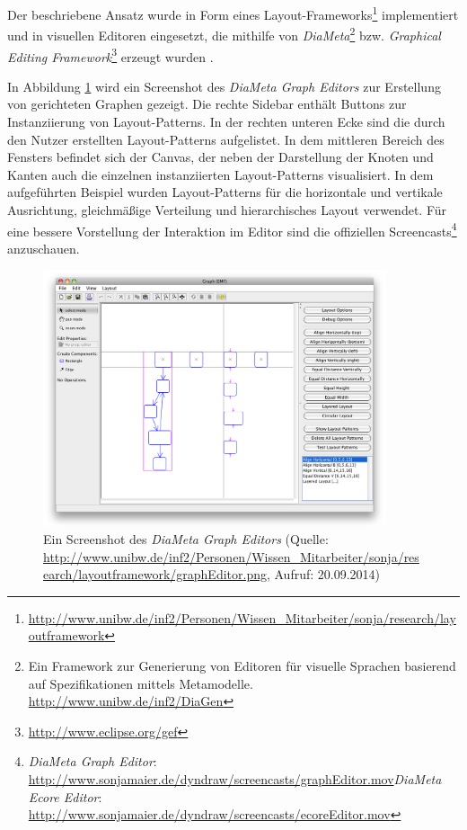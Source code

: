 Der beschriebene Ansatz wurde in Form eines Layout-Frameworks\footnote{\url{http://www.unibw.de/inf2/Personen/Wissen_Mitarbeiter/sonja/research/layoutframework}} implementiert und in visuellen Editoren eingesetzt, die mithilfe von \textit{DiaMeta}\footnote{Ein Framework zur Generierung von Editoren für visuelle Sprachen basierend auf Spezifikationen mittels Metamodelle. \url{http://www.unibw.de/inf2/DiaGen}} bzw. \textit{Graphical Editing Framework}\footnote{\url{http://www.eclipse.org/gef}} erzeugt wurden \cite{Maier12A-Pattern-based}.

In Abbildung \ref{fig:diameta-graph-editor-screenshot} wird ein Screenshot des \textit{DiaMeta Graph Editors} zur Erstellung von gerichteten Graphen gezeigt. Die rechte Sidebar enthält Buttons zur Instanziierung von Layout-Patterns. In der rechten unteren Ecke sind die durch den Nutzer erstellten Layout-Patterns aufgelistet. In dem mittleren Bereich des Fensters befindet sich der Canvas, der neben der Darstellung der Knoten und Kanten auch die einzelnen instanziierten Layout-Patterns visualisiert. In dem aufgeführten Beispiel wurden Layout-Patterns für die horizontale und vertikale Ausrichtung, gleichmäßige Verteilung und hierarchisches Layout verwendet. Für eine bessere Vorstellung der Interaktion im Editor sind die offiziellen Screencasts\footnote{\textit{DiaMeta Graph Editor}: \url{http://www.sonjamaier.de/dyndraw/screencasts/graphEditor.mov}\newline\textit{DiaMeta Ecore Editor}: \url{http://www.sonjamaier.de/dyndraw/screencasts/ecoreEditor.mov}} anzuschauen.

\begin{figure}[hbt]
    \centering
    \includegraphics[width=0.9\textwidth]{assets/diameta-graph-editor-screenshot}
    \newcommand{\captionvalue}{Ein Screenshot des \textit{DiaMeta Graph Editors}}
    \caption[\captionvalue]{\captionvalue{ }(Quelle: \url{http://www.unibw.de/inf2/Personen/Wissen_Mitarbeiter/sonja/research/layoutframework/graphEditor.png}, Aufruf: 20.09.2014)}
    \label{fig:diameta-graph-editor-screenshot}
\end{figure}

